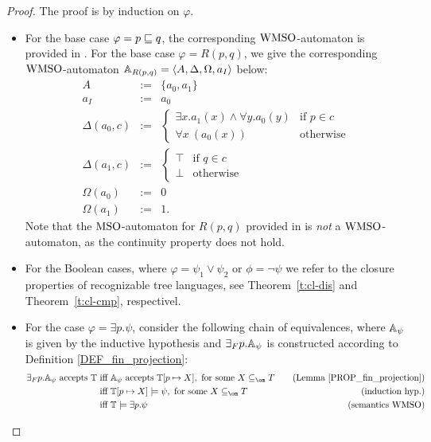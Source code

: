 \begin{proof} The proof is by induction on $\varphi$.
\begin{itemize}
  \item For the base case $\varphi = p \sqsubseteq q$, the corresponding 
  $\mathrm{WMSO}$-automaton is provided in \cite[Ex. 2.6]{Zanasi:Thesis:2012}. 
  For the base case $\varphi = R(p,q)$, we give the corresponding 
  $\mathrm{WMSO}$-automaton $\mathbb{A}_{R(p,q)} = \langle{A,\Delta,\Omega,a_I}\rangle$ below:
\begin{eqnarray*}
        A &:=& \{a_0,a_1\}\\
        a_I &:=& a_0\\
  \Delta(a_0,c) &:=& \left\{
	\begin{array}{ll}
           \exists x. a_1(x) \wedge \forall y. a_0(y) & \mbox{if }p \in c 
	\\ \forall x\ (a_0(x)) & \mbox{otherwise}
	\end{array}
\right. \\
  \Delta(a_1,c) &:=& \left\{
	\begin{array}{ll}
        \top & \mbox{if }q \in c \\
        \bot & \mbox{otherwise}
	\end{array}
\right. \\
    \Omega(a_0) &:=& 0\\
    \Omega(a_1) &:=& 1.
\end{eqnarray*}
Note that the $\mathrm{MSO}$-automaton for $R(p,q)$ provided in 
\cite[Ex. 2.5]{Zanasi:Thesis:2012} is \emph{not} a $\mathrm{WMSO}$-automaton, as the 
continuity property does not hold.

\item
For the Boolean cases, where $\varphi = \psi_1 \vee \psi_2$ or $\phi = \neg\psi$
we refer to the closure properties of recognizable tree languages, see 
Theorem~\ref{t:cl-dis} and Theorem~\ref{t:cl-cmp}, 
respectivel.
  
\item 
For the case $\varphi = \exists p. \psi$, consider the following chain of
equivalences, where $\mathbb{A}_{\psi}$ is given by the inductive hypothesis and 
${{\exists}_F p}.\mathbb{A}_{\psi}$ is constructed according to 
Definition \ref{DEF_fin_projection}:
\begin{alignat*}{2}
{{\exists}_F p}.\aut_{\psi} \text{ accepts }\mb{T} 
   & \text{ iff }
     \aut_{\psi} \text{ accepts } \mb{T}[p \mapsto X], 
     \text{ for some } X \sse_{\om} T
   & \quad\text{(Lemma~\ref{PROP_fin_projection})}
\\ & \text{ iff }
     \mb{T}[p \mapsto X] \models \psi,
     \text{ for some } X \sse_{\om} T
   & \quad\text{(induction hyp.)}
\\ & \text{ iff }
    \mb{T} \models \exists p. \psi
   & \quad\text{(semantics $\wmso$)}
\end{alignat*}
\end{itemize}
\end{proof}


